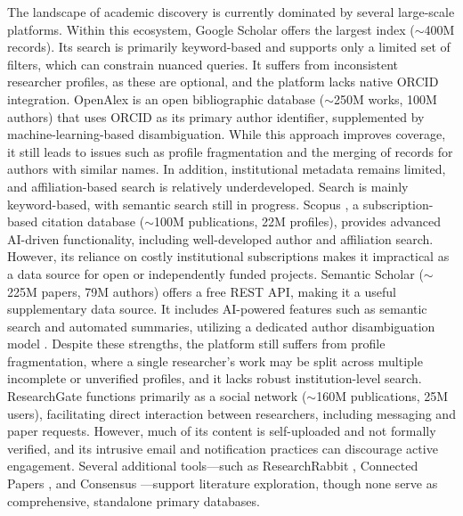 \documentclass[sigconf, nonacm]{acmart}
\begin{document}
The landscape of academic discovery is currently dominated by several large-scale platforms. Within this ecosystem, Google Scholar \cite{delgado2019google} offers the largest index ($\sim$400M records). Its search is primarily keyword-based and supports only a limited set of filters, which can constrain nuanced queries. It suffers from inconsistent researcher profiles, as these are optional, and the platform lacks native ORCID \cite{haak2012orcid} integration. OpenAlex \cite{priem2022openalex} is an open bibliographic database ($\sim$250M works, 100M authors) that uses ORCID as its primary author identifier, supplemented by machine-learning-based disambiguation. While this approach improves coverage, it still leads to issues such as profile fragmentation and the merging of records for authors with similar names. In addition, institutional metadata remains limited, and affiliation-based search is relatively underdeveloped. Search is mainly keyword-based, with semantic search still in progress. Scopus \cite{guz2009scopus}, a subscription-based citation database ($\sim$100M publications, 22M profiles), provides advanced AI-driven functionality, including well-developed author and affiliation search. However, its reliance on costly institutional subscriptions makes it impractical as a data source for open or independently funded projects. Semantic Scholar \cite{kinney2023semantic} ($\sim$225M papers, 79M authors) offers a free REST API, making it a useful supplementary data source. It includes AI-powered features such as semantic search and automated summaries, utilizing a dedicated author disambiguation model \cite{Subramanian2021S2ANDAB}. Despite these strengths, the platform still suffers from profile fragmentation, where a single researcher’s work may be split across multiple incomplete or unverified profiles, and it lacks robust institution-level search. ResearchGate \cite{researchgatearticle} functions primarily as a social network ($\sim$160M publications, 25M users), facilitating direct interaction between researchers, including messaging and paper requests. However, much of its content is self-uploaded and not formally verified, and its intrusive email and notification practices can discourage active engagement. Several additional tools—such as ResearchRabbit \cite{researchrabbit2025}, Connected Papers \cite{connectedpapers2026}, and Consensus \cite{consensus2026}—support literature exploration, though none serve as comprehensive, standalone primary databases.
\end{document}
